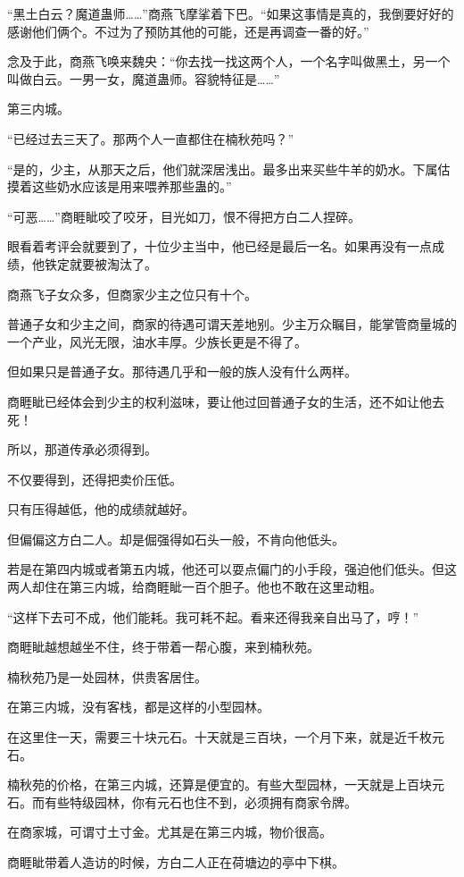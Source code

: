 \begin{this_body}
“黑土白云？魔道蛊师……”商燕飞摩挲着下巴。“如果这事情是真的，我倒要好好的感谢他们俩个。不过为了预防其他的可能，还是再调查一番的好。”

念及于此，商燕飞唤来魏央：“你去找一找这两个人，一个名字叫做黑土，另一个叫做白云。一男一女，魔道蛊师。容貌特征是……”

第三内城。

“已经过去三天了。那两个人一直都住在楠秋苑吗？”

“是的，少主，从那天之后，他们就深居浅出。最多出来买些牛羊的奶水。下属估摸着这些奶水应该是用来喂养那些蛊的。”

“可恶……”商睚眦咬了咬牙，目光如刀，恨不得把方白二人捏碎。

眼看着考评会就要到了，十位少主当中，他已经是最后一名。如果再没有一点成绩，他铁定就要被淘汰了。

商燕飞子女众多，但商家少主之位只有十个。

普通子女和少主之间，商家的待遇可谓天差地别。少主万众瞩目，能掌管商量城的一个产业，风光无限，油水丰厚。少族长更是不得了。

但如果只是普通子女。那待遇几乎和一般的族人没有什么两样。

商睚眦已经体会到少主的权利滋味，要让他过回普通子女的生活，还不如让他去死！

所以，那道传承必须得到。

不仅要得到，还得把卖价压低。

只有压得越低，他的成绩就越好。

但偏偏这方白二人。却是倔强得如石头一般，不肯向他低头。

若是在第四内城或者第五内城，他还可以耍点偏门的小手段，强迫他们低头。但这两人却住在第三内城，给商睚眦一百个胆子。他也不敢在这里动粗。

“这样下去可不成，他们能耗。我可耗不起。看来还得我亲自出马了，哼！”

商睚眦越想越坐不住，终于带着一帮心腹，来到楠秋苑。

楠秋苑乃是一处园林，供贵客居住。

在第三内城，没有客栈，都是这样的小型园林。

在这里住一天，需要三十块元石。十天就是三百块，一个月下来，就是近千枚元石。

楠秋苑的价格，在第三内城，还算是便宜的。有些大型园林，一天就是上百块元石。而有些特级园林，你有元石也住不到，必须拥有商家令牌。

在商家城，可谓寸土寸金。尤其是在第三内城，物价很高。

商睚眦带着人造访的时候，方白二人正在荷塘边的亭中下棋。


\end{this_body}
